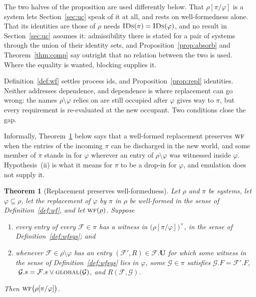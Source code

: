 \documentclass[11pt,a4paper]{article}
\newcommand{\uses}{\mathbf{U}}
\newcommand{\WF}{\op{wf}}
\newcommand{\F}{\mathcal{F}}
\newcommand{\G}{\mathcal{G}}
\newcommand{\op}[1]{\textsc{#1}}
\newcommand{\IDs}{\op{IDs}}
\theoremstyle{accentdef}
\theoremstyle{accentplain}
\newtheorem{theorem}[definition]{Theorem}
\begin{document}
The two halves of the proposition are used differently below. That $\rho[\pi/\varphi]$ is a system
lets Section~\ref{sec:uc} speak of it at all, and rests on well-formedness alone. That its
identities are those of $\rho$ needs $\IDs(\pi) = \IDs(\varphi)$, and no result in
Section~\ref{sec:uc} assumes it: admissibility there is stated for a pair of systems through the
union of their identity sets, and Proposition~\ref{prop:absorb} and Theorem~\ref{thm:comp} say
outright that no relation between the two is used. Where the equality is wanted, blocking supplies
it.

Definition~\ref{def:wf} settles process ids, and Proposition~\ref{prop:repl} identities. Neither
addresses dependence, and dependence is where replacement can go wrong: the names
$\rho \setminus \varphi$ relies on are still occupied after $\varphi$ gives way to $\pi$, but
every requirement is re-evaluated at the new occupant. Two conditions close the gap.

Informally, Theorem~\ref{thm:wfrepl} below says that a well-formed replacement preserves $\WF$
when the entries of the incoming $\pi$ can be discharged in the new world, and some member of
$\pi$ stands in for $\varphi$ wherever an entry of $\rho \setminus \varphi$ was witnessed inside
$\varphi$. Hypothesis~(ii) is what it means for $\pi$ to be a drop-in for $\varphi$, and
emulation does not supply it.

\begin{theorem}[Replacement preserves well-formedness]\label{thm:wfrepl}
Let $\rho$ and $\pi$ be systems, let $\varphi \subseteq \rho$, let the replacement of $\varphi$
by $\pi$ in $\rho$ be well-formed
in the sense of Definition~\ref{def:wf}, and let $\WF(\rho)$. Suppose
\begin{enumerate}[label=(\roman*),leftmargin=2.2em]
  \item every entry of every $\F \in \pi$ has a witness in $\bigl(\rho[\pi/\varphi]\bigr)^{+}$,
        in the sense of Definition~\ref{def:wfsys}; and
  \item whenever $\F \in \rho \setminus \varphi$ has an entry $(\F',R) \in \F.\uses$ for which
        \emph{some} witness in the sense of Definition~\ref{def:wfsys} lies in $\varphi$, some
        $\G \in \pi$ satisfies
        $\G.F = \F'.F$, $\ \G.s = \F.s \vee \op{global}(\G)$, and $R(\F,\G)$.
\end{enumerate}
Then $\WF\bigl(\rho[\pi/\varphi]\bigr)$.
\end{theorem}
\end{document}
